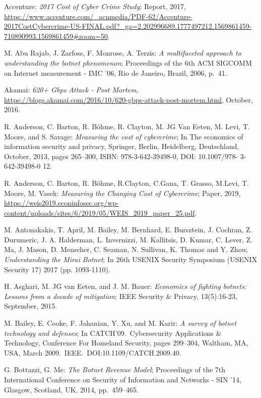 \begin{thebibliography}{99}
 Accenture: \emph{2017 Cost of Cyber Crime Study}; Report, 2017, \url{https://www.accenture.com/_acnmedia/PDF-62/Accenture-2017CostCybercrime-US-FINAL.pdf?_ga=2.202996689.1777497212.1569861459-710890993.1569861459#zoom=50}.

 M. Abu Rajab, J. Zarfoss, F. Monrose, A. Terzis: \emph{A multifaceted approach to understanding the botnet phenomenon}; Proceedings of the 6th ACM SIGCOMM on Internet measurement  - IMC '06, Rio de Janeiro, Brazil, 2006, p.\ 41.

 Akamai: \emph{620+ Gbps Attack - Post Mortem}, \url{https://blogs.akamai.com/2016/10/620-gbps-attack-post-mortem.html}, October, 2016.

 R. Anderson, C. Barton, R. B\"ohme, R. Clayton, M. JG Van Eeten, M. Levi, T. Moore, and S. Savage: \emph{Measuring the cost of cybercrime}; In The economics of information security and privacy, Springer, Berlin, Heidelberg, Deutschland, October, 2013, pages 265--300, ISBN: 978-3-642-39498-0, DOI: 10.1007/978- 3-642-39498-0 12.

 R. Anderson, C. Barton, R. B\"ohme, R.Clayton, C.Gana, T. Grasso, M.Levi, T. Moore, M. Vasek: \emph{Measuring the Changing Cost of Cybercrime}; Paper, 2019, \url{https://weis2019.econinfosec.org/wp-content/uploads/sites/6/2019/05/WEIS_2019_paper_25.pdf}.

 M. Antonakakis, T. April, M. Bailey, M. Bernhard, E. Bursztein, J. Cochran, Z. Durumeric, J. A. Halderman, L. Invernizzi, M. Kallitsis, D. Kumar, C. Lever, Z. Ma, J. Mason, D. Menscher, C. Seaman, N. Sullivan, K. Thomas and Y. Zhou; \emph{Understanding the Mirai Botnet}; In 26th {USENIX} Security Symposium ({USENIX} Security 17) 2017 (pp. 1093-1110).

 H. Asghari, M. JG van Eeten, and J. M. Bauer: \emph{Economics of fighting botnets: Lessons from a decade of mitigation}; IEEE Security \& Privacy, 13(5):16-23, September, 2015.

 M. Bailey, E. Cooke, F. Jahanian, Y. Xu, and M. Karir: \emph{A survey of botnet technology and defenses}; In CATCH'09.\ Cybersecurity Applications \& Technology, Conference For Homeland Security, pages 299--304, Waltham, MA, USA, March 2009.\ IEEE.\ DOI:10.1109/CATCH.2009.40.

 G. Bottazzi, G. Me: \emph{The Botnet Revenue Model}; Proceedings of the 7th International Conference on Security of Information and Networks - SIN '14, Glasgow, Scotland, UK, 2014, pp.\ 459--465.


\end{thebibliography}
